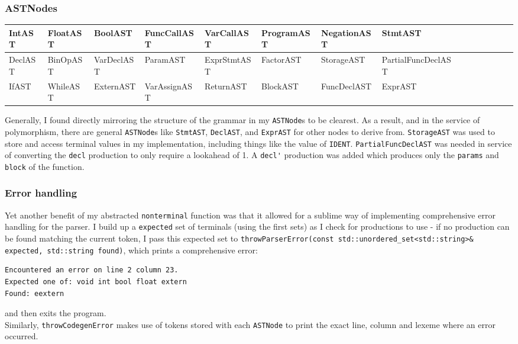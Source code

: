 \documentclass[10pt,a4paper]{article}
\newcommand{\code}[1]{\lstinline!#1!}
\begin{document}
\subsubsection*{ASTNodes}
\begin{table}[htbp]
    \centering
    \begin{adjustbox}{center}
    \begin{tabular}{|l|l|l|l|l|l|l|l|l|l|l|l|l|l|l|}
    \hline
    IntAST & FloatAST & BoolAST & FuncCallAST & VarCallAST & ProgramAST & NegationAST & StmtAST\\
    \hline
    DeclAST & BinOpAST & VarDeclAST & ParamAST & ExprStmtAST&FactorAST & StorageAST & PartialFuncDeclAST\\
    \hline
    IfAST & WhileAST & ExternAST & VarAssignAST & ReturnAST & BlockAST & FuncDeclAST & ExprAST\\
    \hline
    \end{tabular}
\end{adjustbox}
\end{table}
\noindent Generally, I found directly mirroring the structure of the grammar in my \code{ASTNode}s to be clearest. As a result, and in the service of polymorphism, there are general \code{ASTNode}s like \code{StmtAST}, \code{DeclAST}, and \code{ExprAST} for other nodes to derive from.
\code{StorageAST} was used to store and access terminal values in my implementation, including things like the value of \code{IDENT}. \code{PartialFuncDeclAST} was needed in service of converting the \code{decl} production to only require a lookahead of 1. A \code{decl'} production was added which produces only the \code{params} and \code{block} of the function.
\subsubsection*{Error handling}
Yet another benefit of my abstracted \code{nonterminal} function was that it allowed for a sublime way of implementing comprehensive error handling for the parser. I build up a \code{expected} set of terminals (using the first sets) as I check for productions to use - if no production can be found matching the current token, I pass this expected set to \code{throwParserError(const std::unordered_set<std::string>& expected, std::string found)}, which prints a comprehensive error:
\begin{lstlisting}[]
Encountered an error on line 2 column 23.
Expected one of: void int bool float extern 
Found: eextern
\end{lstlisting}
and then exits the program.\\
Similarly,
\code{throwCodegenError} makes use of tokens stored with each \code{ASTNode} to print the exact line, column and lexeme where an error occurred.
\end{document}
